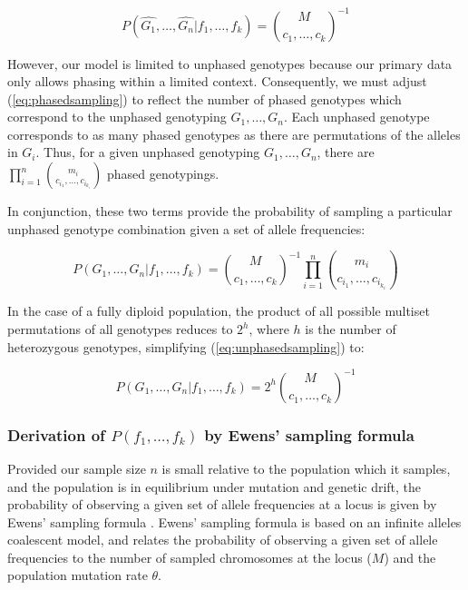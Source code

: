\documentclass{article}
\begin{document}
\begin{equation}
\label{eq:phasedsampling}
P(\hat{G_1},\ldots,\hat{G_n} | f_1,\ldots,f_k) =
{M \choose
  c_1,\ldots,c_k }^{-1}
\end{equation}

However, our model is limited to unphased genotypes because our primary data only allows phasing within a limited context. Consequently, we must adjust (\ref{eq:phasedsampling}) to reflect the number of phased genotypes which correspond to the unphased genotyping $G_1,\ldots,G_n$.  Each unphased genotype corresponds to as many phased genotypes as there are permutations of the alleles in $G_i$.  Thus, for a given unphased genotyping $G_1,\ldots,G_n$, there are $\prod_{i=1}^n { m_i \choose c_{i_1}, \ldots, c_{i_{k_i}}}$ phased genotypings.

In conjunction, these two terms provide the probability of sampling a particular unphased genotype combination given a set of allele frequencies:

\begin{equation}
\label{eq:unphasedsampling}
P(G_1,\ldots,G_n | f_1,\ldots,f_k) =
{ M \choose c_1,\ldots,c_k }^{-1}
\prod_{i=1}^n { m_i \choose c_{i_1}, \ldots, c_{i_{k_i}}}
\end{equation}


In the case of a fully diploid population, the product of all possible multiset permutations of all genotypes reduces to $2^h$, where $h$ is the number of heterozygous genotypes, simplifying (\ref{eq:unphasedsampling}) to:

\begin{equation}
P(G_1,\ldots,G_n | f_1,\ldots,f_k) =
2^h
{ M \choose c_1,\ldots,c_k }^{-1}
\end{equation}


\subsubsection{Derivation of $P(f_1,\ldots,f_k)$ by Ewens' sampling formula}

Provided our sample size $n$ is small relative to the population which it samples, and the population is in equilibrium under mutation and genetic drift, the probability of observing a given set of allele frequencies at a locus is given by Ewens' sampling formula \citep{ewens72}.  Ewens' sampling formula is based on an infinite alleles coalescent model, and relates the probability of observing a given set of allele frequencies to the number of sampled chromosomes at the locus ($M$) and the population mutation rate $\theta$.
\end{document}
